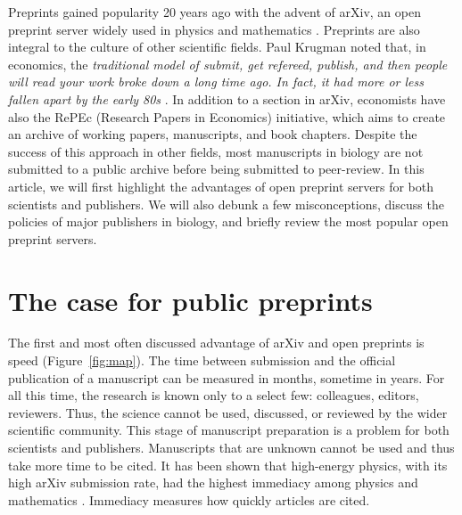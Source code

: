 \documentclass[letterpaper,twocolumn,superscriptaddress,showkeys]{revtex4-1}
\begin{document}
Preprints gained popularity 20 years ago with the advent of arXiv, an open
preprint server widely used in physics and mathematics \cite{gin11}. Preprints
are also integral to the culture of other scientific fields.  Paul Krugman noted
that, in economics, the \emph{traditional model of submit, get refereed,
publish, and then people will read your work broke down a long time ago. In
fact, it had more or less fallen apart by the early 80s} \cite{kru12}. In
addition to a section in arXiv, economists have also the RePEc (Research Papers
in Economics) initiative, which aims to create an archive of working papers,
manuscripts, and book chapters.  Despite the success of this approach in other
fields, most manuscripts in biology are not submitted to a public archive before
being submitted to peer-review.  In this article, we will first highlight the
advantages of open preprint servers for both scientists and publishers. We will
also debunk a few misconceptions, discuss the policies of major publishers in
biology, and briefly review the most popular open preprint servers.

\section{The case for public preprints}

The first and most often discussed advantage of arXiv and open preprints is
speed (Figure~\ref{fig:map}). The time between submission and the official
publication of a manuscript can be measured in months, sometime in years. For
all this time, the research is known only to a select few: colleagues, editors,
reviewers.  Thus, the science cannot be used, discussed, or reviewed by the
wider scientific community.  This stage of manuscript preparation is a problem
for both scientists and publishers.  Manuscripts that are unknown cannot be used
and thus take more time to be cited. It has been shown that high-energy physics,
with its high arXiv submission rate, had the highest immediacy among physics and
mathematics \cite{pra05}. Immediacy measures how quickly articles are cited. 
\end{document}
